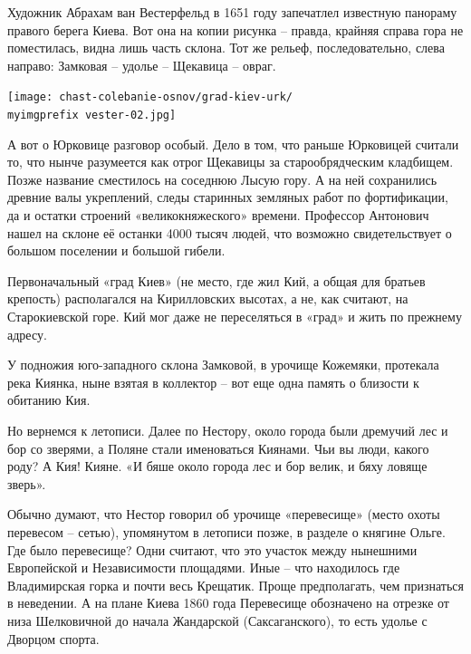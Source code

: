 Художник Абрахам ван Вестерфельд в 1651 году запечатлел известную панораму правого берега Киева. Вот она на копии рисунка – правда, крайняя справа гора не поместилась, видна лишь часть склона. Тот же рельеф, последовательно, слева направо: Замковая – удолье – Щекавица – овраг.
 
\begin{center}
\texttt{[image: chast-colebanie-osnov/grad-kiev-urk/\\myimgprefix vester-02.jpg]}
\end{center} 

А вот о Юрковице разговор особый. Дело в том, что раньше Юрковицей считали то, что нынче разумеется как отрог Щекавицы за старообрядческим кладбищем. Позже название сместилось на соседнюю Лысую гору. А на ней сохранились древние валы укреплений, следы старинных земляных работ по фортификации, да и остатки строений «великокняжеского» времени. Профессор Антонович нашел на склоне её останки 4000 тысяч людей, что возможно свидетельствует о большом поселении и большой гибели.

Первоначальный «град Киев» (не место, где жил Кий, а общая для братьев крепость) располагался на Кирилловских высотах, а не, как считают, на Старокиевской горе. Кий мог даже не переселяться в «град» и жить по прежнему адресу.

У подножия юго-западного склона Замковой, в урочище Кожемяки, протекала река Киянка, ныне взятая в коллектор – вот еще одна память о близости к обитанию Кия.

Но вернемся к летописи. Далее по Нестору, около города были дремучий лес и бор со зверями, а Поляне стали именоваться Киянами. Чьи вы люди, какого роду? А Кия! Кияне. «И бяше около города лес и бор велик, и бяху ловяще зверь». 

Обычно думают, что Нестор говорил об урочище «перевесище» (место охоты перевесом – сетью), упомянутом в летописи позже, в разделе о княгине Ольге. Где было перевесище? Одни считают, что это участок между нынешними Европейской и Независимости площадями. Иные – что находилось где Владимирская горка и почти весь Крещатик. Проще предполагать, чем признаться в неведении. А на плане Киева 1860 года Перевесище обозначено на отрезке от низа Шелковичной до начала Жандарской (Саксаганского), то есть удолье с Дворцом спорта.




